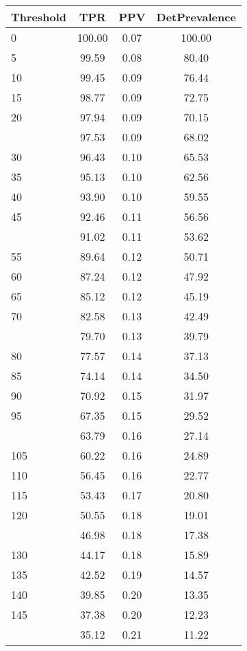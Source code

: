 \begin{table}[ht]
\centering
\begin{tabular}{lccc}
  \toprule
Threshold & TPR & PPV & DetPrevalence \\ 
  \midrule
0 & 100.00 & 0.07 & 100.00 \\ 
  5 & 99.59 & 0.08 & 80.40 \\ 
  10 & 99.45 & 0.09 & 76.44 \\ 
  15 & 98.77 & 0.09 & 72.75 \\ 
  20 & 97.94 & 0.09 & 70.15 \\ 
   \addlinespace
25 & 97.53 & 0.09 & 68.02 \\ 
  30 & 96.43 & 0.10 & 65.53 \\ 
  35 & 95.13 & 0.10 & 62.56 \\ 
  40 & 93.90 & 0.10 & 59.55 \\ 
  45 & 92.46 & 0.11 & 56.56 \\ 
   \addlinespace
50 & 91.02 & 0.11 & 53.62 \\ 
  55 & 89.64 & 0.12 & 50.71 \\ 
  60 & 87.24 & 0.12 & 47.92 \\ 
  65 & 85.12 & 0.12 & 45.19 \\ 
  70 & 82.58 & 0.13 & 42.49 \\ 
   \addlinespace
75 & 79.70 & 0.13 & 39.79 \\ 
  80 & 77.57 & 0.14 & 37.13 \\ 
  85 & 74.14 & 0.14 & 34.50 \\ 
  90 & 70.92 & 0.15 & 31.97 \\ 
  95 & 67.35 & 0.15 & 29.52 \\ 
   \addlinespace
100 & 63.79 & 0.16 & 27.14 \\ 
  105 & 60.22 & 0.16 & 24.89 \\ 
  110 & 56.45 & 0.16 & 22.77 \\ 
  115 & 53.43 & 0.17 & 20.80 \\ 
  120 & 50.55 & 0.18 & 19.01 \\ 
   \addlinespace
125 & 46.98 & 0.18 & 17.38 \\ 
  130 & 44.17 & 0.18 & 15.89 \\ 
  135 & 42.52 & 0.19 & 14.57 \\ 
  140 & 39.85 & 0.20 & 13.35 \\ 
  145 & 37.38 & 0.20 & 12.23 \\ 
   \addlinespace
150 & 35.12 & 0.21 & 11.22 \\ 

\end{tabular}
\end{table}
